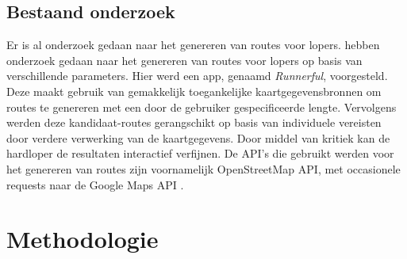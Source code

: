 \subsection{Bestaand onderzoek}
Er is al onderzoek gedaan naar het genereren van routes voor lopers.
\textcite{Loepp2018} hebben onderzoek gedaan naar het genereren van routes voor lopers op basis van verschillende parameters.
Hier werd een app, genaamd \emph{Runnerful}, voorgesteld.
Deze maakt gebruik van gemakkelijk toegankelijke kaartgegevensbronnen om routes te genereren met een door de gebruiker gespecificeerde lengte.
Vervolgens werden  deze kandidaat-routes gerangschikt op basis van individuele vereisten door verdere verwerking van de kaartgegevens.
Door middel van kritiek kan de hardloper de resultaten interactief verfijnen.
De API's die gebruikt werden voor het genereren van routes zijn voornamelijk OpenStreetMap API,
met occasionele requests naar de Google Maps API \autocite{Loepp2018}.


\section{Methodologie}%
\label{sec:methodologie}

